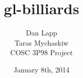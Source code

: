 \documentclass[12pt]{article}
\title{gl-billiards}
\author{Dan Lapp\\Taras Mychaskiw\\COSC 3P98 Project}
\date{January 8th, 2014}
\begin{document}
\maketitle
    \begin{abstract}
    \end{abstract}

    \thispagestyle{empty}
    \tableofcontents
    \thispagestyle{empty}
    \mbox{}
    \clearpage
    \setcounter{page}{1}
    
    
\end{document}
